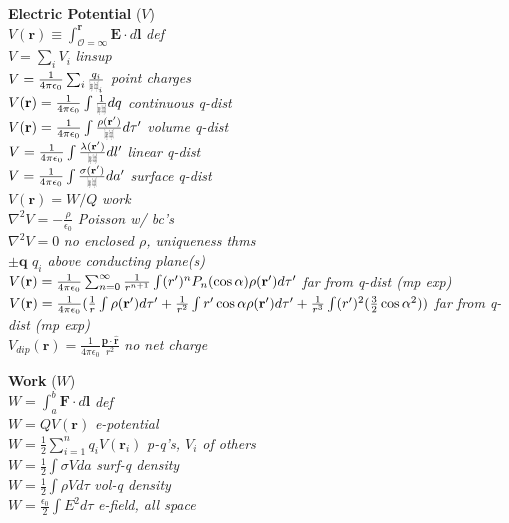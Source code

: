 \documentclass{article}
\def\rcurs{{\mbox{$\resizebox{.09in}{.08in}{\texttt{[image: ScriptR]}}$}}}
\begin{document}
\begin{multicols}{3}
\textbf{Electric Potential} ($V$) \\
$V(\mathbf{r}) \equiv\int_{\mathcal{O}=\infty}^{\mathbf{r}} \mathbf{E}\cdot d\mathbf{l}$ \textit{def} \\
$V = \sum_{i}V_{i}$ \textit{linsup} \\
$V = \frac{1}{4\pi\epsilon_{0}}\sum_{i}\frac{q_{i}}{\rcurs_{i}}$ \textit{point charges} \\
$V(\mathbf{r}) = \frac{1}{4\pi\epsilon_{0}}\int\frac{1}{\rcurs}dq$ \textit{continuous q-dist} \\
$V(\mathbf{r}) = \frac{1}{4\pi\epsilon_{0}}\int\frac{\rho(\mathbf{r'})}{\rcurs}d\tau'$  \textit{volume q-dist} \\
$V = \frac{1}{4\pi\epsilon_{0}}\int\frac{\lambda(\mathbf{r'})}{\rcurs}dl'$ \textit{linear q-dist} \\
$V = \frac{1}{4\pi\epsilon_{0}}\int\frac{\sigma(\mathbf{r'})}{\rcurs}da'$ \textit{surface q-dist} \\
$V(\mathbf{r}) = W/Q$ \textit{work} \\
$\nabla^{2}V = -\frac{\rho}{\epsilon_{0}}$ \textit{Poisson w/ bc's} \\
$\nabla^{2}V = 0$ \textit{no enclosed $\rho$, uniqueness thms} \\
$\pm\mathbf{q}$  \textit{$q_{i}$ above conducting plane(s)} \\
$V(\mathbf{r}) = \frac{1}{4\pi\epsilon_{0}}\sum_{n=0}^{\infty}\frac{1}{r^{n+1}}\\\int(r')^{n}P_{n}(\cos{\alpha})\rho(\mathbf{r'})d\tau'$ \textit{far from q-dist (mp exp)} \\
$V(\mathbf{r}) = \frac{1}{4\pi\epsilon_{0}} (\frac{1}{r}\int\rho(\mathbf{r'})d\tau' \\ + \frac{1}{r^{2}}\int r'\cos{\alpha}\rho(\mathbf{r'})d\tau' \\ + \frac{1}{r^{3}}\int(r')^{2}(\frac{3}{2}\cos{\alpha}^{2}))$  \textit{far from q-dist (mp exp)} \\
$V_{dip}(\mathbf{r}) = \frac{1}{4\pi\epsilon_{0}}\frac{\mathbf{p}\cdot\mathbf{\hat{r}}}{r^{2}}$  \textit{no net charge}


\textbf{Work} ($W$)\\
$W = \int_{a}^{b}\mathbf{F}\cdot d\mathbf{l}$ \textit{def} \\
$W = QV(\mathbf{r})$ \textit{e-potential} \\
$W = \frac{1}{2}\sum_{i=1}^{n}q_{i}V(\mathbf{r}_{i})$ \textit{p-q's, $V_{i}$  of others} \\
$W = \frac{1}{2}\int\sigma V da$ \textit{surf-q density} \\
$W = \frac{1}{2}\int\rho V d\tau$ \textit{vol-q density} \\
$W = \frac{\epsilon_{0}}{2}\int E^{2}d\tau $ \textit{e-field, all space}


\end{multicols}
\end{document}
